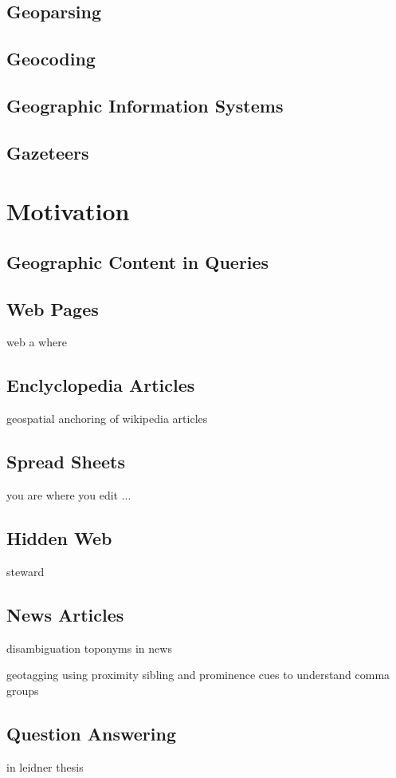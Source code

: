 \documentclass[
     11pt,         %
     a4paper,      %
     oneside,
     ]{article}
\begin{document}
\subsection{Geoparsing}
\subsection{Geocoding}
\subsection{Geographic Information Systems}
\subsection{Gazeteers}

\section{Motivation}\label{sec:sections}
\subsection{Geographic Content in Queries}
\cite{Gan:2008:AGQ:1367798.1367806}
\subsection{Web Pages} web a where
\subsection{Enclyclopedia Articles} geospatial anchoring of wikipedia articles
\subsection{Spread Sheets} you are where you edit ...
\subsection{Hidden Web} steward
\subsection{News Articles} 

disambiguation toponyms in news

geotagging using proximity sibling and prominence cues to understand comma groups

\subsection{Question Answering} in leidner thesis
\end{document}
